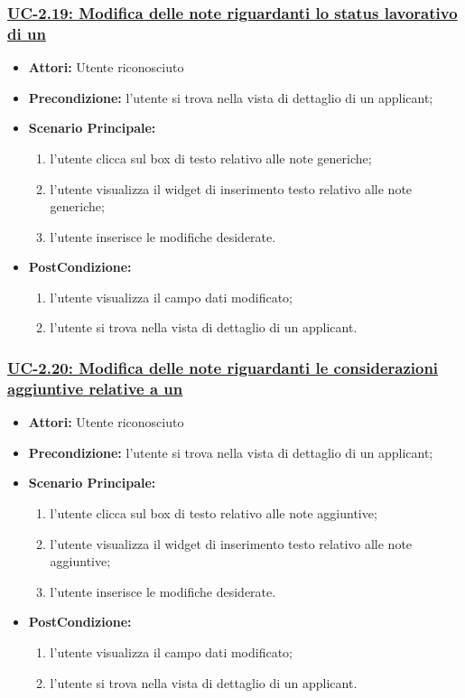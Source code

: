 \subsubsection{\underline{UC-2.19: Modifica delle note riguardanti lo status lavorativo di un \applicant}}
\begin{itemize}
	\item \textbf{Attori:} Utente riconosciuto
	\item \textbf{Precondizione:}  l'utente si trova nella vista di dettaglio di un applicant;
	\item \textbf{Scenario Principale:}
	\begin{enumerate}
		\item l'utente clicca sul box di testo relativo alle note generiche;
		\item l'utente visualizza il  widget di inserimento testo relativo alle note generiche;
		\item l'utente inserisce le modifiche desiderate.
	\end{enumerate}
	\item \textbf{PostCondizione:} 
	\begin{enumerate}
		\item l'utente visualizza il campo dati modificato;
		\item l'utente si trova nella vista di dettaglio di un applicant.
	\end{enumerate}
	
\end{itemize}

\subsubsection{\underline{UC-2.20: Modifica delle note riguardanti le considerazioni aggiuntive relative a un \applicant}}
\begin{itemize}
	\item \textbf{Attori:} Utente riconosciuto
	\item \textbf{Precondizione:}  l'utente si trova nella vista di dettaglio di un applicant;
	\item \textbf{Scenario Principale:}
	\begin{enumerate}
		\item l'utente clicca sul box di testo relativo alle note aggiuntive;
		\item l'utente visualizza il  widget di inserimento testo relativo alle note aggiuntive;
		\item l'utente inserisce le modifiche desiderate.
	\end{enumerate}
	\item \textbf{PostCondizione:} 
	\begin{enumerate}
		\item l'utente visualizza il campo dati modificato;
		\item l'utente si trova nella vista di dettaglio di un applicant.
	\end{enumerate}
	
\end{itemize}



